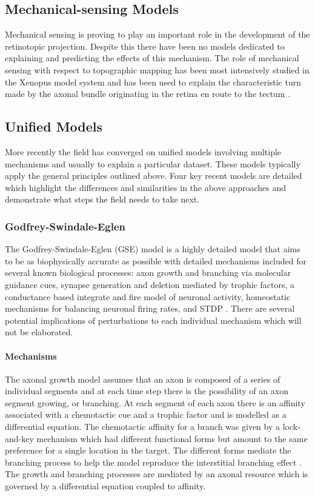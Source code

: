 \subsection{Mechanical-sensing Models}
Mechanical sensing is proving to play an important role in the development of the retinotopic projection. Despite this there have been no models dedicated to  explaining and predicting the effects of this mechanism. The role of mechanical sensing with respect to topographic mapping has been most intensively studied in the Xenopus model system and has been used to explain the characteristic turn made by the axonal bundle originating in the retina en route to the tectum \cite{Koser2016-tm}.

\subsection{Unified Models}
More recently the field has converged on unified models involving multiple mechanisms and usually to explain a particular dataset. These models typically apply the general principles outlined above. Four key recent models are detailed which highlight the differences and similarities in the above approaches and demonstrate what steps the field needs to take next.

\subsubsection{Godfrey-Swindale-Eglen}
The Godfrey-Swindale-Eglen (GSE) model is a highly detailed model that aims to be as biophysically accurate as possible with detailed mechanisms included for several known biological processes: axon growth and branching via molecular guidance cues, synapse generation and deletion mediated by trophic factors, a conductance based integrate and fire model of neuronal activity, homeostatic mechanisms for balancing neuronal firing rates, and STDP \cite{Godfrey2009-ts}. There are several potential implications of perturbations to each individual mechanism which will not be elaborated. 
\paragraph{Mechanisms}
The axonal growth model assumes that an axon is composed of a series of individual segments and at each time step there is the possibility of an axon segment growing, or branching. At each segment of each axon there is an affinity associated with a chemotactic cue and a trophic factor and is modelled as a differential equation. The chemotactic affinity for a branch was given by a lock-and-key mechanism which had different functional forms but amount to the same preference for a single location in the target. The different forms mediate the branching process to help the model reproduce the interstitial branching effect \cite{McLaughlin2003-nf, McLaughlin2003-co, Hindges2002-rt}. The growth and branching processes are mediated by an axonal resource which is governed by a differential equation coupled to affinity.

